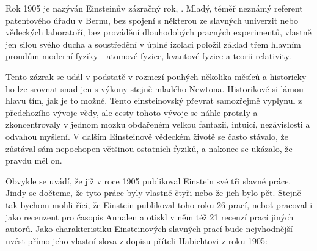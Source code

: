         Rok 1905 je nazýván Einsteinův zázračný rok, \emph{}. Mladý, téměř
        neznámý referent patentového úřadu v Bernu, bez spojení s některou ze slavných univerzit
        nebo vědeckých laboratoří, bez provádění dlouhodobých pracných experimentů, vlastně jen
        silou svého ducha a soustředění v úplné izolaci položil základ třem hlavním proudům moderní
        fyziky - atomové fyzice, kvantové fyzice a teorii relativity. 

        Tento zázrak se udál v podstatě v rozmezí pouhých několika měsíců a historicky ho lze
        srovnat snad jen s výkony stejně mladého Newtona. Historikové si lámou hlavu tím, jak je to
        možné. Tento einsteinovský převrat samozřejmě vyplynul z předchozího vývoje vědy, ale cesty
        tohoto vývoje se náhle proťaly a zkoncentrovaly v jednom mozku obdařeném velkou fantazii,
        intuicí, nezávislosti a odvahou myšlení. V dalším Einsteinově vědeckém životě se často
        stávalo, že zůstával sám nepochopen většinou ostatních fyziků, a nakonec se ukázalo, že
        pravdu měl on.

        Obvykle se uvádí, že již v roce 1905 publikoval Einstein své tři slavné práce. Jindy se
        dočteme, že tyto práce byly vlastně čtyři nebo že jich bylo pět. Stejně tak bychom mohli
        říci, že Einstein publikoval toho roku 26 prací, neboť pracoval i jako recenzent pro časopis
        Annalen a otiskl v něm též 21 recenzí prací jiných autorů. Jako charakteristiku
        Einsteinových slavných prací bude nejvhodnější uvést přímo jeho vlastní slova z dopisu
        příteli Habichtovi z roku 1905:

        \emph{} 
        
